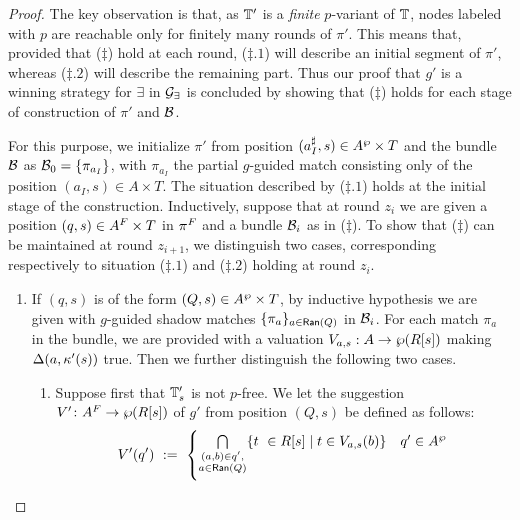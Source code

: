 \begin{proof}
The key observation is that, as $\mathbb{T}'$ is a \emph{finite} $p$-variant of $\mathbb{T}$, nodes labeled with $p$ are reachable only for finitely many rounds of $\pi'$. This means that, provided that ($\ddag$) hold at each round, ($\ddag.1$) will describe an initial segment of $\pi'$, whereas ($\ddag.2$) will describe the remaining part. Thus our proof that $g'$ is a winning strategy for $\exists$ in $\mathcal{G}_{\exists}$ is concluded by showing that ($\ddag$) holds for each stage of construction of $\pi'$ and $\mathcal{B}$.

\medskip

For this purpose, we initialize $\pi'$ from position $(a_{I}^{\sharp},s) \in A^{\wp}\times T$ and the bundle $\mathcal{B}$ as $\mathcal{B}_0 = \{\pi_{a_I}\}$, with $\pi_{a_I}$ the partial $g$-guided match consisting only of the position $(a_I,s)\in A\times T$. The situation described by ($\ddag .1$) holds at the initial stage of the construction.
Inductively, suppose that at round $z_i$ we are given a position $(q,s) \in A^{F} \times T$ in $\pi^{F}$ and a bundle $\mathcal{B}_i$ as in ($\ddag$). To show that ($\ddag$) can be maintained at round $z_{i+1}$, we distinguish two cases, corresponding respectively to situation ($\ddag.1$) and ($\ddag.2$) holding at round $z_i$.
\begin{enumerate}[label = (\Alph*), ref = \Alph*]
  \item If $(q,s)$ is of the form $(Q,s) \in A^{\wp} \times T$, by inductive hypothesis we are given with $g$-guided shadow matches $\{\pi_a\}_{a \in \mathsf{Ran}(Q)}$ in $\mathcal{B}_i$. For each match $\pi_a$ in the bundle, we are provided with a valuation $V_{a,s}: A \rightarrow \wp (R[s])$ making $\Delta(a,\kappa'(s))$ true. Then we further distinguish the following two cases.
\begin{enumerate}[label = (\roman*), ref = \roman*]
  \item \label{point:TsNotPFree} Suppose first that $\mathbb{T}'_s$ is not $p$-free. We let the suggestion $V' \colon A^{F} \to \wp (R[s])$ of $g'$ from position $(Q,s)$ be defined as follows:
       \begin{align*}
       V'(q')\ :=\ \begin{cases}
               \bigcap\limits_{\substack{(a,b) \in q',\\ a \in \mathsf{Ran}(Q)}}\{t\ \in R[s] \mid t \in V_{a,s}(b)\}               & q' \in A^{\wp} \\[2em]

\end{cases}
\end{align*}
\end{enumerate}
\end{enumerate}
\end{proof}

